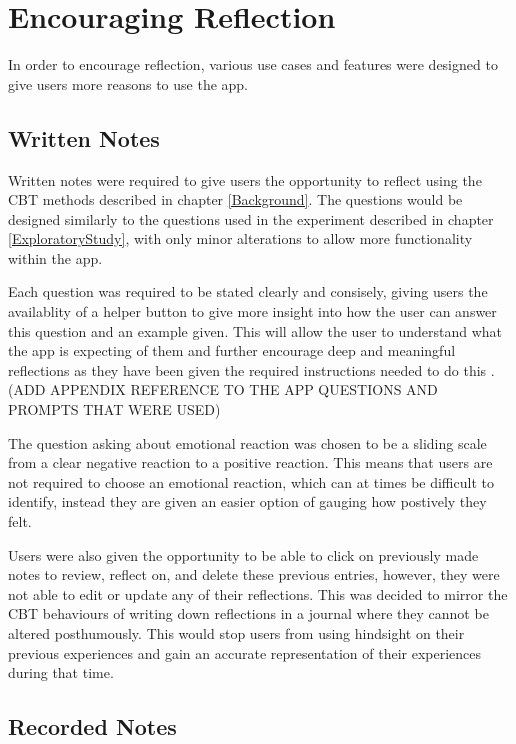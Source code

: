 \documentclass{l4proj}
\begin{document}
\section{Encouraging Reflection}

In order to encourage reflection, various use cases and features were designed to give users more reasons to use the app.

\subsection{Written Notes}

Written notes were required to give users the opportunity to reflect using the CBT methods described in chapter \ref{Background}. The questions would be designed similarly to the questions used in the experiment described in chapter \ref{ExploratoryStudy}, with only minor alterations to allow more functionality within the app. 

Each question was required to be stated clearly and consisely, giving users the availablity of a helper button to give more insight into how the user can answer this question and an example given. This will allow the user to understand what the app is expecting of them and further encourage deep and meaningful reflections as they have been given the required instructions needed to do this \citep{bruno_reflective_2018}. (ADD APPENDIX REFERENCE TO THE APP QUESTIONS AND PROMPTS THAT WERE USED)

The question asking about emotional reaction was chosen to be a sliding scale from a clear negative reaction to a positive reaction. This means that users are not required to choose an emotional reaction, which can at times be difficult to identify, instead they are given an easier option of gauging how postively they felt. 

Users were also given the opportunity to be able to click on previously made notes to review, reflect on, and delete these previous entries, however, they were not able to edit or update any of their reflections. This was decided to mirror the CBT behaviours of writing down reflections in a journal where they cannot be altered posthumously. This would stop users from using hindsight on their previous experiences and gain an accurate representation of their experiences during that time. 

\subsection{Recorded Notes}
\end{document}
